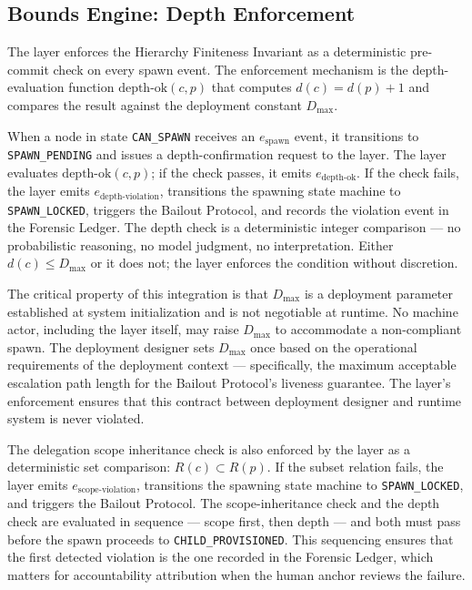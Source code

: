 \subsection{Bounds Engine: Depth Enforcement}
\label{sec:rs-bounds-depth}

The \Bounds{} layer enforces the Hierarchy Finiteness Invariant as a
deterministic pre-commit check on every spawn event.  The enforcement mechanism
is the depth-evaluation function $\text{depth-ok}(c, p)$ that computes
$d(c) = d(p) + 1$ and compares the result against the deployment constant
$D_{\max}$.

When a node in state \texttt{CAN\_SPAWN} receives an $e_{\text{spawn}}$ event,
it transitions to \texttt{SPAWN\_PENDING} and issues a depth-confirmation
request to the \Bounds{} layer.  The \Bounds{} layer evaluates
$\text{depth-ok}(c, p)$; if the check passes, it emits $e_{\text{depth-ok}}$.
If the check fails, the \Bounds{} layer emits $e_{\text{depth-violation}}$,
transitions the spawning state machine to \texttt{SPAWN\_LOCKED}, triggers the
Bailout Protocol, and records the violation event in the Forensic Ledger.
The depth check is a deterministic integer comparison — no probabilistic
reasoning, no model judgment, no interpretation.  Either $d(c) \leq D_{\max}$
or it does not; the \Bounds{} layer enforces the condition without discretion.

The critical property of this integration is that $D_{\max}$ is a deployment
parameter established at system initialization and is not negotiable at runtime.
No machine actor, including the \Bounds{} layer itself, may raise $D_{\max}$
to accommodate a non-compliant spawn.  The deployment designer sets $D_{\max}$
once based on the operational requirements of the deployment context —
specifically, the maximum acceptable escalation path length for the Bailout
Protocol's liveness guarantee.  The \Bounds{} layer's enforcement ensures that
this contract between deployment designer and runtime system is never violated.

The delegation scope inheritance check is also enforced by the \Bounds{} layer
as a deterministic set comparison: $R(c) \subset R(p)$.  If the subset relation
fails, the \Bounds{} layer emits $e_{\text{scope-violation}}$, transitions the
spawning state machine to \texttt{SPAWN\_LOCKED}, and triggers the Bailout
Protocol.  The scope-inheritance check and the depth check are evaluated in
sequence — scope first, then depth — and both must pass before the spawn
proceeds to \texttt{CHILD\_PROVISIONED}.  This sequencing ensures that the first
detected violation is the one recorded in the Forensic Ledger, which matters for
accountability attribution when the human anchor reviews the failure.

